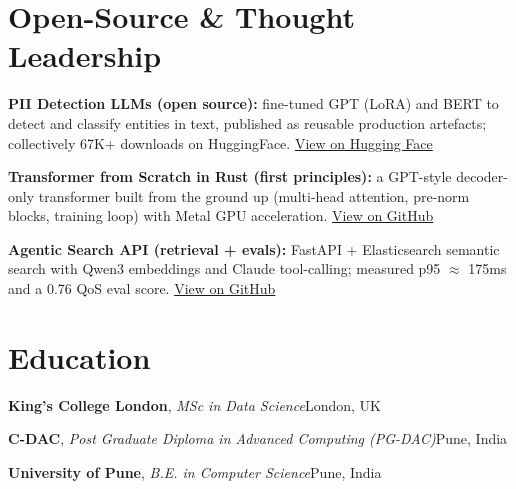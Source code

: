 \documentclass[10pt,a4paper]{article}
\begin{document}
\section{Open-Source \& Thought Leadership}
\begin{tight}
  \item \textbf{PII Detection LLMs (open source):} fine-tuned GPT (LoRA) and BERT to detect and classify entities in text, published as reusable production artefacts; collectively 67K+ downloads on HuggingFace. \href{https://huggingface.co/ab-ai/pii_model}{View on Hugging Face}
  \item \textbf{Transformer from Scratch in Rust (first principles):} a GPT-style decoder-only transformer built from the ground up (multi-head attention, pre-norm blocks, training loop) with Metal GPU acceleration. \href{https://github.com/abhijeetscode/transformer-rust}{View on GitHub}
  \item \textbf{Agentic Search API (retrieval + evals):} FastAPI + Elasticsearch semantic search with Qwen3 embeddings and Claude tool-calling; measured p95 $\approx$ 175ms and a 0.76 QoS eval score. \href{https://github.com/abhijeetscode/search-agent}{View on GitHub}
\end{tight}

\section{Education}
{\color{company}\bfseries King's College London}, {\itshape MSc in Data Science}\hfill {\color{muted}London, UK}\par\vspace{1pt}
{\color{company}\bfseries C-DAC}, {\itshape Post Graduate Diploma in Advanced Computing (PG-DAC)}\hfill {\color{muted}Pune, India}\par\vspace{1pt}
{\color{company}\bfseries University of Pune}, {\itshape B.E. in Computer Science}\hfill {\color{muted}Pune, India}\par
\end{document}
